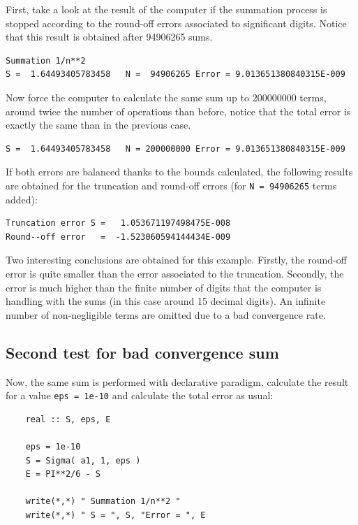 First, take a look at the result of the computer if the summation process is stopped according to the 
round-off errors associated to significant digits. Notice that this result is obtained after 94906265 sums.

\begin{verbatim} 
Summation 1/n**2
S =  1.64493405783458   N =  94906265 Error = 9.013651380840315E-009
\end{verbatim}

Now force the computer to calculate the same sum up to 200000000 terms, 
around twice the number of operations than before,
notice that the total error is exactly the same than in the
previous case.

\begin{verbatim} 
S =  1.64493405783458   N = 200000000 Error = 9.013651380840315E-009
\end{verbatim}

If both errors are balanced thanks to the bounds calculated, 
the following results are obtained for the truncation and round-off errors 
(for \texttt{N = 94906265} terms added):

\begin{verbatim} 
Truncation error S =   1.053671197498475E-008
Round--off error   =  -1.523060594144434E-009
\end{verbatim}

Two interesting conclusions are obtained for this example. 
Firstly, 
the round-off error is quite smaller than the error associated to the truncation. 
Secondly,
the error is much higher than the finite number of digits that the computer 
is handling with the sums (in this case around 15 decimal digits). An infinite number of
non-negligible terms are omitted due to a bad convergence rate. 






    \subsection{Second test for bad convergence sum}

Now, the same sum is performed with declarative paradigm, 
calculate the result for a value \texttt{eps = 1e-10} 
and calculate the total error as usual:
\begin{verbatim} 
    real :: S, eps, E
    
    eps = 1e-10
    S = Sigma( a1, 1, eps )
    E = PI**2/6 - S
    
    write(*,*) " Summation 1/n**2 "
    write(*,*) " S = ", S, "Error = ", E    
\end{verbatim}

